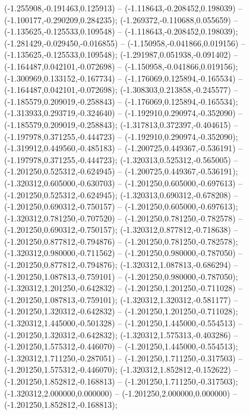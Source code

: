  (-1.255908,-0.191463,0.125913) -- (-1.118643,-0.208452,0.198039) -- (-1.100177,-0.290209,0.284235);
 (-1.269372,-0.110688,0.055659) -- (-1.135625,-0.125533,0.109548) -- (-1.118643,-0.208452,0.198039);
 (-1.281429,-0.029450,-0.016855) -- (-1.150958,-0.041866,0.019156) -- (-1.135625,-0.125533,0.109548);
 (-1.291987,0.051938,-0.091402) -- (-1.164487,0.042101,-0.072698) -- (-1.150958,-0.041866,0.019156);
 (-1.300969,0.133152,-0.167734) -- (-1.176069,0.125894,-0.165534) -- (-1.164487,0.042101,-0.072698);
 (-1.308303,0.213858,-0.245577) -- (-1.185579,0.209019,-0.258843) -- (-1.176069,0.125894,-0.165534);
 (-1.313933,0.293719,-0.324640) -- (-1.192910,0.290974,-0.352090) -- (-1.185579,0.209019,-0.258843);
 (-1.317813,0.372397,-0.404615) -- (-1.197978,0.371255,-0.444723) -- (-1.192910,0.290974,-0.352090);
 (-1.319912,0.449560,-0.485183) -- (-1.200725,0.449367,-0.536191) -- (-1.197978,0.371255,-0.444723);
 (-1.320313,0.525312,-0.565005) -- (-1.201250,0.525312,-0.624945) -- (-1.200725,0.449367,-0.536191);
 (-1.320312,0.605000,-0.630703) -- (-1.201250,0.605000,-0.697613) -- (-1.201250,0.525312,-0.624945);
 (-1.320313,0.690312,-0.678208) -- (-1.201250,0.690312,-0.750157) -- (-1.201250,0.605000,-0.697613);
 (-1.320312,0.781250,-0.707520) -- (-1.201250,0.781250,-0.782578) -- (-1.201250,0.690312,-0.750157);
 (-1.320312,0.877812,-0.718638) -- (-1.201250,0.877812,-0.794876) -- (-1.201250,0.781250,-0.782578);
 (-1.320312,0.980000,-0.711562) -- (-1.201250,0.980000,-0.787050) -- (-1.201250,0.877812,-0.794876);
 (-1.320312,1.087813,-0.686294) -- (-1.201250,1.087813,-0.759101) -- (-1.201250,0.980000,-0.787050);
 (-1.320312,1.201250,-0.642832) -- (-1.201250,1.201250,-0.711028) -- (-1.201250,1.087813,-0.759101);
 (-1.320312,1.320312,-0.581177) -- (-1.201250,1.320312,-0.642832) -- (-1.201250,1.201250,-0.711028);
 (-1.320312,1.445000,-0.501328) -- (-1.201250,1.445000,-0.554513) -- (-1.201250,1.320312,-0.642832);
 (-1.320312,1.575313,-0.403286) -- (-1.201250,1.575312,-0.446070) -- (-1.201250,1.445000,-0.554513);
 (-1.320312,1.711250,-0.287051) -- (-1.201250,1.711250,-0.317503) -- (-1.201250,1.575312,-0.446070);
 (-1.320312,1.852812,-0.152622) -- (-1.201250,1.852812,-0.168813) -- (-1.201250,1.711250,-0.317503);
 (-1.320312,2.000000,0.000000) -- (-1.201250,2.000000,0.000000) -- (-1.201250,1.852812,-0.168813);
